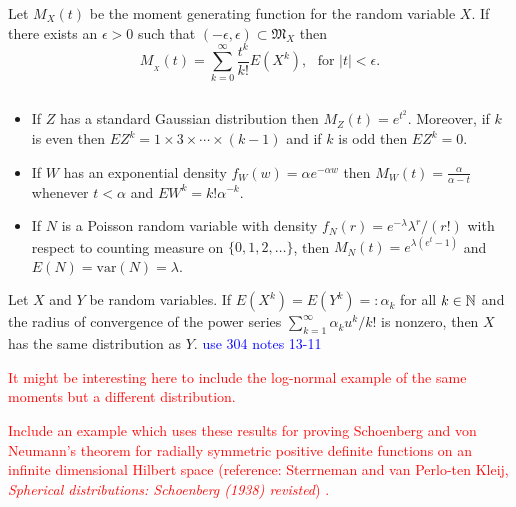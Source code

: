 \begin{shaded}





\begin{theorem}
Let $M_{X}(t)$ be the moment generating function for the random variable $X$.   If there exists an $\epsilon>0$ such that $(-\epsilon,\epsilon)\subset \mathfrak M_X$ then
\[ M_{_X}(t)= \sum_{k=0}^\infty \frac{t^k}{k!} E(X^k),\,\,\text{ for $|t|<\epsilon$.} \]
\end{theorem}


\begin{corollary}$\phantom{}$
\begin{itemize}
\item
If $Z$ has a standard Gaussian distribution then $M_Z(t)=e^{t^2}$. Moreover, if $k$ is even then $EZ^k=1\times 3\times \cdots \times (k-1)$ and if $k$ is odd then $EZ^k=0$.
 \item
If $W$ has an exponential density $f_W(w) = \alpha e^{-\alpha w}$ then $M_W(t)=\frac{\alpha}{\alpha -t}$ whenever $t<\alpha$ and $EW^k= k!\alpha^{-k}$.
\item If $N$ is a Poisson random variable  with density $f_N(r) =  e^{-\lambda} \lambda^r/(r!)$ with respect to counting measure on $\{0,1,2,\ldots\}$, then $M_N(t)= e^{\lambda(e^t -1)}$ and  $E(N) = \text{var}(N) = \lambda$.
 \end{itemize}
\end{corollary}





\begin{theorem}
Let $X$ and $Y$ be random variables. If $E(X^k) = E(Y^k) =: \alpha_k $ for all $k\in \Bbb N$ and the radius of convergence of the power series $\sum_{k=1}^\infty \alpha_k u^k/k!$ is nonzero, then $X$ has the same distribution as $Y$. \textcolor{blue}{use 304 notes 13-11}
\end{theorem}


\textcolor{red}{
It might be interesting here to include the log-normal example of the same moments but a different distribution.}


\textcolor{red}{
Include an example which uses these results for proving Schoenberg and von Neumann's theorem for radially symmetric positive definite functions on an infinite dimensional Hilbert space (reference: Sterrneman and van Perlo-ten Kleij, {\em Spherical distributions: Schoenberg (1938) revisted})
.}


\end{shaded}
